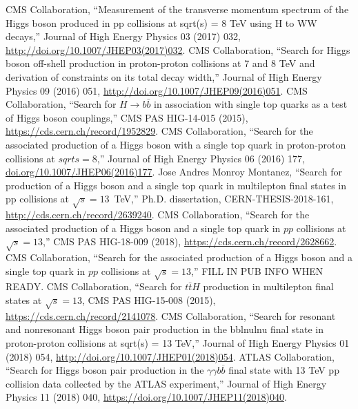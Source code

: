 \begin{thebibliography}{99}
%
    CMS Collaboration, ``Measurement of the transverse momentum spectrum of the Higgs boson produced in pp collisions at sqrt(s) = 8 TeV using H to WW decays,'' Journal of High Energy Physics 03 (2017) 032, \url{http://doi.org/10.1007/JHEP03(2017)032}.
%
    CMS Collaboration, ``Search for Higgs boson off-shell production in proton-proton collisions at 7 and 8 TeV and derivation of constraints on its total decay width,'' Journal of High Energy Physics 09 (2016) 051, \url{http://doi.org/10.1007/JHEP09(2016)051}.
%
%
 CMS Collaboration, ``Search for $H \to b\bar{b}$ in
  association with single top quarks as a test of Higgs boson couplings,'' CMS PAS HIG-14-015 (2015), \url{https://cds.cern.ch/record/1952829}.
%
 CMS Collaboration, ``Search for the associated
  production of a Higgs boson with a single top quark in proton-proton
  collisions at $sqrt{s} = 8$\TeV,'' Journal of High Energy Physics 06 (2016) 177, \url{doi.org/10.1007/JHEP06(2016)177}.
%
 Jose Andres Monroy Montanez, ``Search for production of a Higgs boson and a single top quark in multilepton final states in pp collisions at $\sqrt{s} = 13$~TeV,'' Ph.D. dissertation, CERN-THESIS-2018-161, \url{http://cds.cern.ch/record/2639240}.
%
 CMS Collaboration, ``Search for the associated
    production of a Higgs boson and a single top quark in $pp$ collisions
    at $\sqrt{s} = 13$\TeV,'' CMS PAS HIG-18-009 (2018),
    \url{https://cds.cern.ch/record/2628662}.
%
 CMS Collaboration, ``Search for the associated
    production of a Higgs boson and a single top quark in $pp$ collisions
    at $\sqrt{s} = 13$\TeV,'' FILL IN PUB INFO WHEN READY.
%
 CMS Collaboration, ``Search for $t\bar{t}H$
  production in multilepton final states at $\sqrt{s} = 13$\TeV, CMS PAS
  HIG-15-008 (2015), \url{https://cds.cern.ch/record/2141078}.
%
%
    CMS Collaboration, ``Search for resonant and nonresonant Higgs boson pair production in the bblnulnu final state in proton-proton collisions at sqrt(s) = 13 TeV,'' 
    Journal of High Energy Physics 01 (2018) 054, \url{http://doi.org/10.1007/JHEP01(2018)054}.
%
    ATLAS Collaboration, ``Search for Higgs boson pair production in the $\gamma\gamma b\overline{b}$ final state with 13 TeV pp collision data collected by the ATLAS experiment,''
    Journal of High Energy Physics 11 (2018) 040, \url{https://doi.org/10.1007/JHEP11(2018)040}.

\end{thebibliography}
